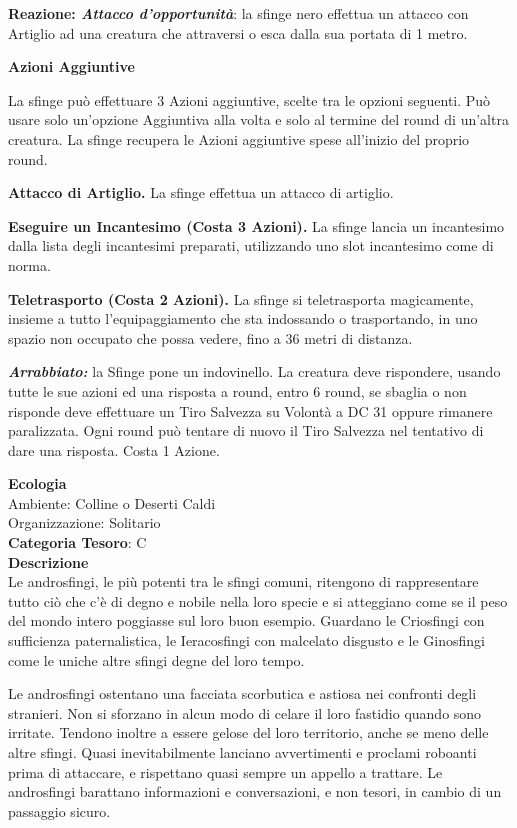 \begin{multicols}{2}
{\textbf{Reazione: \emph{Attacco d'opportunità}}: la sfinge nero effettua un attacco con Artiglio ad una creatura che attraversi o esca dalla sua portata di 1 metro.

\textbf{Azioni Aggiuntive}

La sfinge può effettuare 3 Azioni aggiuntive, scelte tra le opzioni seguenti. Può usare solo un'opzione Aggiuntiva alla volta e solo al termine del round di un'altra creatura. La sfinge recupera le Azioni aggiuntive spese all'inizio del proprio round.

\textbf{Attacco di Artiglio.} La sfinge effettua un attacco di artiglio.

\textbf{Eseguire un Incantesimo (Costa 3 Azioni).} La sfinge lancia un incantesimo dalla lista degli incantesimi preparati, utilizzando uno slot incantesimo come di norma.

\textbf{Teletrasporto (Costa 2 Azioni).} La sfinge si teletrasporta magicamente, insieme a tutto l'equipaggiamento che sta indossando o trasportando, in uno spazio non occupato che possa vedere, fino a 36 metri di distanza.

\emph{\textbf{Arrabbiato:}} la Sfinge pone un indovinello. La creatura deve rispondere, usando tutte le sue azioni ed una risposta a round, entro 6 round, se sbaglia o non risponde deve effettuare un Tiro Salvezza su Volontà a DC 31 oppure rimanere paralizzata. Ogni round può tentare di nuovo il Tiro Salvezza nel tentativo di dare una risposta. Costa 1 Azione.

\textbf{Ecologia}\\
Ambiente: Colline o Deserti Caldi\\
Organizzazione: Solitario\\
\textbf{Categoria Tesoro}: C\\
\textbf{Descrizione}\\
Le androsfingi, le più potenti tra le sfingi comuni, ritengono di rappresentare tutto ciò che c'è di degno e nobile nella loro specie e si atteggiano come se il peso del mondo intero poggiasse sul loro buon esempio. Guardano le Criosfingi con sufficienza paternalistica, le Ieracosfingi con malcelato disgusto e le Ginosfingi come le uniche altre sfingi degne del loro tempo.

Le androsfingi ostentano una facciata scorbutica e astiosa nei confronti degli stranieri. Non si sforzano in alcun modo di celare il loro fastidio quando sono irritate. Tendono inoltre a essere gelose del loro territorio, anche se meno delle altre sfingi. Quasi inevitabilmente lanciano avvertimenti e proclami roboanti prima di attaccare, e rispettano quasi sempre un appello a trattare. Le androsfingi barattano informazioni e conversazioni, e non tesori, in cambio di un passaggio sicuro.

}
\end{multicols}
